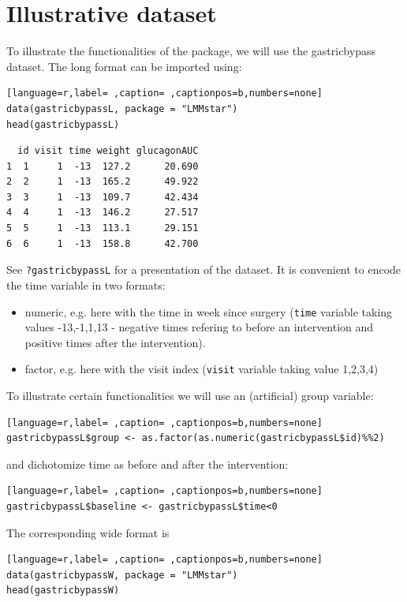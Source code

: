 \documentclass[12pt]{article}
\begin{document}
\clearpage

\section{Illustrative dataset}
\label{sec:org10904bc}

To illustrate the functionalities of the package, we will use the
gastricbypass dataset. The long format can be imported using:
\begin{lstlisting}[language=r,label= ,caption= ,captionpos=b,numbers=none]
data(gastricbypassL, package = "LMMstar")
head(gastricbypassL)
\end{lstlisting}

\begin{verbatim}
  id visit time weight glucagonAUC
1  1     1  -13  127.2      20.690
2  2     1  -13  165.2      49.922
3  3     1  -13  109.7      42.434
4  4     1  -13  146.2      27.517
5  5     1  -13  113.1      29.151
6  6     1  -13  158.8      42.700
\end{verbatim}


See \texttt{?gastricbypassL} for a presentation of the dataset. It is
convenient to encode the time variable in two formats:
\begin{itemize}
\item numeric, e.g. here with the time in week since surgery (\texttt{time}
variable taking values -13,-1,1,13 - negative times refering to
before an intervention and positive times after the intervention).
\item factor, e.g. here with the visit index (\texttt{visit} variable taking
value 1,2,3,4)
\end{itemize}

To illustrate certain functionalities we will use an (artificial)
group variable:
\begin{lstlisting}[language=r,label= ,caption= ,captionpos=b,numbers=none]
gastricbypassL$group <- as.factor(as.numeric(gastricbypassL$id)%%2)
\end{lstlisting}

and dichotomize time as before and after the intervention:
\begin{lstlisting}[language=r,label= ,caption= ,captionpos=b,numbers=none]
gastricbypassL$baseline <- gastricbypassL$time<0
\end{lstlisting}

The corresponding wide format is
\begin{lstlisting}[language=r,label= ,caption= ,captionpos=b,numbers=none]
data(gastricbypassW, package = "LMMstar")
head(gastricbypassW)
\end{lstlisting}
\end{document}
